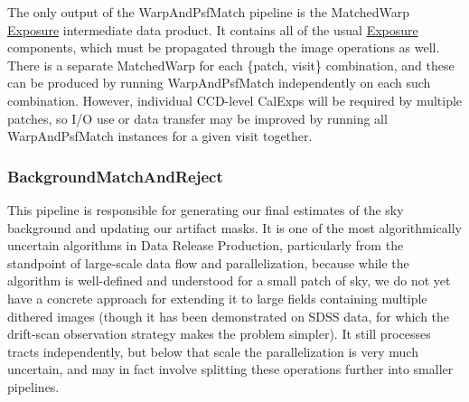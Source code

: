 The only output of the WarpAndPsfMatch pipeline is the MatchedWarp \hyperref[sec:spImagesExposure]{Exposure} intermediate data product.  It contains all of the usual \hyperref[sec:spImagesExposure]{Exposure} components, which must be propagated through the image operations as well.  There is a separate MatchedWarp for each \{patch, visit\} combination, and these can be produced by running WarpAndPsfMatch independently on each such combination.  However, individual CCD-level CalExps will be required by multiple patches, so I/O use or data transfer may be improved by running all WarpAndPsfMatch instances for a given visit together.

\subsubsection{BackgroundMatchAndReject}
\label{sec:drpBackgroundMatchAndReject}

This pipeline is responsible for generating our final estimates of the sky background and updating our artifact masks.  It is one of the most algorithmically uncertain algorithms in Data Release Production, particularly from the standpoint of large-scale data flow and parallelization, because while the algorithm is well-defined and understood for a small patch of sky, we do not yet have a concrete approach for extending it to large fields containing multiple dithered images (though it has been demonstrated on SDSS data, for which the drift-scan observation strategy makes the problem simpler).  It still processes tracts independently, but below that scale the parallelization is very much uncertain, and may in fact involve splitting these operations further into smaller pipelines.

